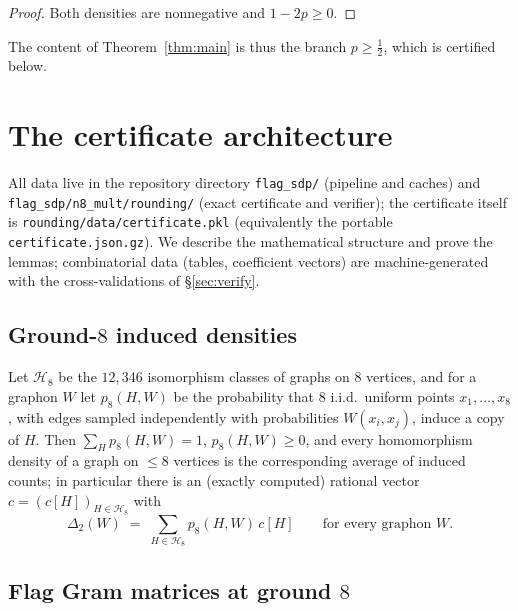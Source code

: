\documentclass[11pt]{article}
\theoremstyle{definition}
\begin{document}
\begin{proof}
Both densities are nonnegative and $1-2p\ge0$.
\end{proof}

The content of Theorem~\ref{thm:main} is thus the branch $p\ge\tfrac12$, which
is certified below.

\section{The certificate architecture}\label{sec:arch}

All data live in the repository directory
\texttt{flag\_sdp/} (pipeline and caches) and
\texttt{flag\_sdp/n8\_mult/rounding/} (exact certificate and verifier); the
certificate itself is
\texttt{rounding/data/certificate.pkl} (equivalently the portable
\texttt{certificate.json.gz}).  We describe the mathematical structure and
prove the lemmas; combinatorial data (tables, coefficient vectors) are
machine-generated with the cross-validations of \S\ref{sec:verify}.

\subsection{Ground-$8$ induced densities}

Let $\mathcal H_8$ be the $12{,}346$ isomorphism classes of graphs on $8$
vertices, and for a graphon $W$ let $p_8(H,W)$ be the probability that $8$
i.i.d.\ uniform points $x_1,\dots,x_8$, with edges sampled independently with
probabilities $W(x_i,x_j)$, induce a copy of $H$.  Then
$\sum_{H}p_8(H,W)=1$, $p_8(H,W)\ge0$, and every homomorphism density of a
graph on $\le8$ vertices is the corresponding average of induced counts; in
particular there is an (exactly computed) rational vector
$c=(c[H])_{H\in\mathcal H_8}$ with
\begin{equation}\label{eq:coef}
  \Delta_2(W)\;=\;\sum_{H\in\mathcal H_8}p_8(H,W)\,c[H]
  \qquad\text{for every graphon }W .
\end{equation}

\subsection{Flag Gram matrices at ground $8$}
\end{document}
